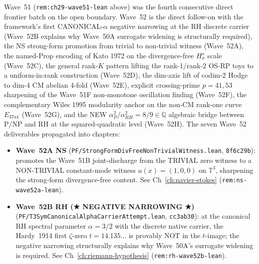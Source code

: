 \begin{remark}\label{rem:ch29-wave52-lean}
Wave~51 (\texttt{rem:ch29-wave51-lean} above) was the fourth consecutive direct frontier batch on the open boundary. Wave~52 is the direct follow-on with the framework's first CANONICAL-$\alpha$ negative narrowing at the RH discrete carrier (Wave~52B explains why Wave~50A surrogate widening is structurally required), the NS strong-form promotion from trivial to non-trivial witness (Wave~52A), the named-Prop encoding of Kato 1972 on the divergence-free $H^s_\sigma$ scale (Wave~52C), the general rank-$K$ pattern lifting the rank-1/rank-2 OS-RP toys to a uniform-in-rank construction (Wave~52D), the dim-axis lift of codim-2 Hodge to dim-4 CM abelian 4-fold (Wave~52E), explicit crossing-prime $p = 41, 53$ sharpening of the Wave~51F non-monotone oscillation finding (Wave~52F), the complementary Wiles 1995 modularity anchor on the non-CM rank-one curve $E_{37a1}$ (Wave~52G), and the NEW $\alpha_P^2 / \alpha_{RH}^2 = 8/9 \in \mathbb{Q}$ algebraic bridge between P/NP and RH at the squared-quadratic level (Wave~52H). The seven Wave~52 deliverables propagated into chapters:
\begin{itemize}
  \item \textbf{Wave~52A NS} (\texttt{PF/StrongFormDivFreeNonTrivialWitness.lean}, \texttt{8f6c29b}): promotes the Wave~51B joint-discharge from the TRIVIAL zero witness to a NON-TRIVIAL constant-mode witness $u(x) = (1, 0, 0)$ on $\mathbb{T}^3$, sharpening the strong-form divergence-free content. See Ch~\ref{ch:navier-stokes} (\texttt{rem:ns-wave52a-lean}).
  \item \textbf{Wave~52B RH (★ NEGATIVE NARROWING ★)} (\texttt{PF/T3SymCanonicalAlphaCarrierAttempt.lean}, \texttt{cc3ab30}): at the canonical RH spectral parameter $\alpha = 3/2$ with the discrete native carrier, the Hardy~1914 first $\zeta$-zero $t = 14.135\ldots$ is provably NOT in the $t$-image; the negative narrowing structurally explains why Wave~50A's surrogate widening is required. See Ch~\ref{ch:riemann-hypothesis} (\texttt{rem:rh-wave52b-lean}).

\end{itemize}
\end{remark}
